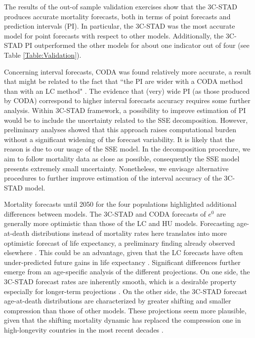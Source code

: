 \documentclass[11pt, a4paper]{article}
\begin{document}
The results of the out-of sample validation exercises show that the 3C-STAD produces accurate mortality forecasts, both in terms of point forecasts and prediction intervals (PI). In particular, the 3C-STAD was the most accurate model for point forecasts with respect to other models. Additionally, the 3C-STAD PI outperformed the other models for about one indicator out of four (see Table \ref{Table:Validation}). 

Concerning interval forecasts, CODA was found relatively more accurate, a result that might be related to the fact that ``the PI are wider with a CODA method than with an LC method" \cite[][pp.~546]{bergeron2017coherent}. The evidence that (very) wide PI (as those produced by CODA) correspond to higher interval forecasts accuracy requires some further analysis. Within 3C-STAD framework, a possibility to improve estimation of PI would be to include the uncertainty related to the SSE decomposition. However, preliminary analyses showed that this approach raises computational burden without a significant widening of the forecast variability. It is likely that the reason is due to our usage of the SSE model. In the decomposition procedure, we aim to follow mortality data as close as possible, consequently the SSE model presents extremely small uncertainty. Nonetheless, we envisage alternative procedures to further improve estimation of the interval accuracy of the 3C-STAD model.

Mortality forecasts until 2050 for the four populations highlighted additional differences between models. The 3C-STAD and CODA forecasts of $e^{0}$ are generally more optimistic than those of the LC and HU models. Forecasting age-at-death distributions instead of mortality rates here translates into more optimistic forecast of life expectancy, a preliminary finding already observed elsewhere \citep{bergeron2017what}. This could be an advantage, given that the LC forecasts have often under-predicted future gains in life expectancy \citep{lee2001evaluating}. Significant differences further emerge from an age-specific analysis of the different projections. On one side, the 3C-STAD forecast rates are inherently smooth, which is a desirable property especially for longer-term projections \citep{li2013extending}. On the other side, the 3C-STAD forecast age-at-death distributions are characterized by greater shifting and smaller compression than those of other models. These projections seem more plausible, given that the shifting mortality dynamic has replaced the compression one in high-longevity countries in the most recent decades \citep{canudas2008modal,bergeron2015decomposing,janssen2019timing}. 
 
\end{document}
